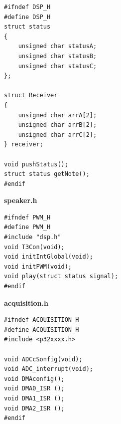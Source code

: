 \documentclass[12pt]{article}
\begin{document}
\lstset{language=C}
\begin{lstlisting}
#ifndef DSP_H
#define DSP_H
struct status
{
    unsigned char statusA;
    unsigned char statusB;
    unsigned char statusC;
};

struct Receiver
{
    unsigned char arrA[2];
    unsigned char arrB[2];
    unsigned char arrC[2];
} receiver;

void pushStatus();
struct status getNote();
#endif 
\end{lstlisting}

\textbf{speaker.h}

\lstset{language=C}
\begin{lstlisting}
#ifndef PWM_H
#define PWM_H
#include "dsp.h"
void T3Con(void);
void initIntGlobal(void);
void initPWM(void);
void play(struct status signal);
#endif
\end{lstlisting}


\textbf{acquisition.h}

\lstset{language=C}
\begin{lstlisting}
#ifndef ACQUISITION_H
#define ACQUISITION_H
#include <p32xxxx.h>

void ADCcSonfig(void);
void ADC_interrupt(void);
void DMAconfig();
void DMA0_ISR ();
void DMA1_ISR ();
void DMA2_ISR ();
#endif
\end{lstlisting}
\end{document}
